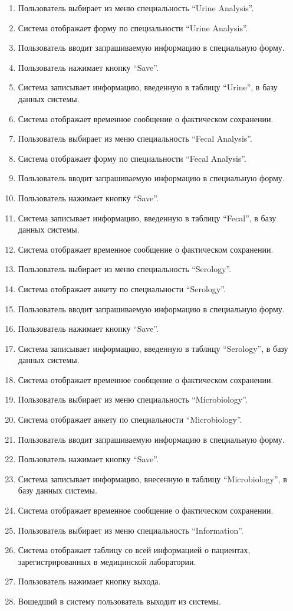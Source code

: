 \begin{enumerate}
	\item Пользователь выбирает из меню специальность ``Urine Analysis''.
	\item Система отображает форму по специальности ``Urine Analysis''.
	\item Пользователь вводит запрашиваемую информацию в специальную форму.
	\item Пользователь нажимает кнопку ``Save''.
	\item Система записывает информацию, введенную в таблицу ``Urine'', в базу данных системы.
	\item Система отображает временное сообщение о фактическом сохранении.
	\item Пользователь выбирает из меню специальность ``Fecal Analysis''.
	\item Система отображает форму по специальности ``Fecal Analysis''.
	\item Пользователь вводит запрашиваемую информацию в специальную форму.
	\item Пользователь нажимает кнопку ``Save''.
	\item Система записывает информацию, введенную в таблицу ``Fecal'', в базу данных системы.
	\item Система отображает временное сообщение о фактическом сохранении.
	\item Пользователь выбирает из меню специальность ``Serology''.
	\item Система отображает анкету по специальности ``Serology''.
	\item Пользователь вводит запрашиваемую информацию в специальную форму.
	\item Пользователь нажимает кнопку ``Save''.
	\item Система записывает информацию, введенную в таблицу ``Serology'', в базу данных системы.
	\item Система отображает временное сообщение о фактическом сохранении.
	\item Пользователь выбирает из меню специальность ``Microbiology''.
	\item Система отображает анкету по специальности ``Microbiology''.
	\item Пользователь вводит запрашиваемую информацию в специальную форму.
	\item Пользователь нажимает кнопку ``Save''.
	\item Система записывает информацию, внесенную в таблицу ``Microbiology'', в базу данных системы.
	\item Система отображает временное сообщение о фактическом сохранении.
	\item Пользователь выбирает из меню специальность ``Information''.
	\item Система отображает таблицу со всей информацией о пациентах, зарегистрированных в медицинской лаборатории.
	\item Пользователь нажимает кнопку выхода.
	\item Вошедший в систему пользователь выходит из системы.
\end{enumerate}

